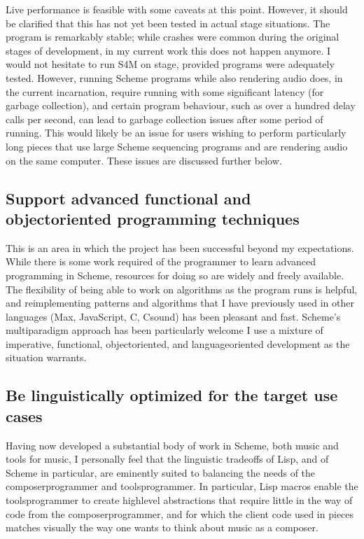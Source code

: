 \documentclass[letterpaper,10pt,english]{sphinxmanual}
\begin{document}
\sphinxAtStartPar
Live performance is feasible with some caveats at this point. However, it should be
clarified that this has not yet been tested in actual stage situations.
The program is remarkably stable; while crashes were common
during the original stages of development, in my current work this
does not happen anymore. I would not hesitate to run S4M on stage,
provided programs were adequately tested.
However, running  Scheme programs while also rendering audio does, in the current incarnation,
require running with some significant latency (for garbage collection), and certain
program behaviour, such as over a hundred delay calls per second, can lead
to garbage collection issues after some period of running.
This would likely be an issue for users wishing to perform
particularly long pieces that use large Scheme sequencing programs and are
rendering audio on the same computer. These issues are discussed further
below.


\subsection{Support advanced functional and object\sphinxhyphen{}oriented programming techniques}
\label{\detokenize{conclusion:support-advanced-functional-and-object-oriented-programming-techniques}}
\sphinxAtStartPar
This is an area in which the project has been successful beyond my expectations.
While there is some work required of the programmer to learn advanced programming in Scheme,
resources for doing so are widely and freely available.
The flexibility of being able to work on algorithms as the program runs is helpful,
and reimplementing patterns and algorithms that I have previously used in other languages
(Max, JavaScript, C, Csound) has been pleasant and fast.
Scheme’s multi\sphinxhyphen{}paradigm approach has been particularly welcome \sphinxhyphen{} I use a mixture
of imperative, functional, object\sphinxhyphen{}oriented, and language\sphinxhyphen{}oriented development as the situation warrants.


\subsection{Be linguistically optimized for the target use cases}
\label{\detokenize{conclusion:be-linguistically-optimized-for-the-target-use-cases}}
\sphinxAtStartPar
Having now developed a substantial body of work in Scheme, both music and tools for music,
I personally feel that the linguistic tradeoffs of Lisp, and of Scheme in particular,
are eminently suited to balancing the needs of the composer\sphinxhyphen{}programmer and tools\sphinxhyphen{}programmer.
In particular, Lisp macros
enable the tools\sphinxhyphen{}programmer to create high\sphinxhyphen{}level abstractions that require
little in the way of code from the composer\sphinxhyphen{}programmer, and for which the client code
used in pieces matches visually the way one wants to think about music as a composer.
\end{document}

